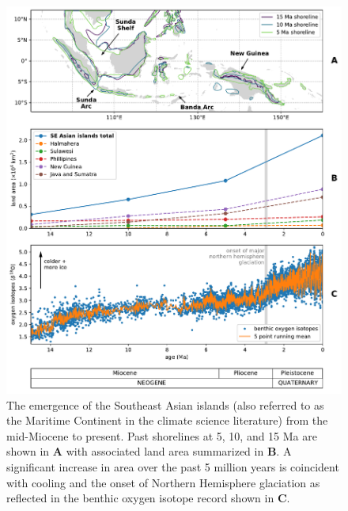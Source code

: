 \begin{figure}[!htbp]
\begin{center}
	\includegraphics[width=\textwidth]{figures/SEAIs/shoreline-growth.pdf}
	\caption[Emergence of the Southeast Asian islands from the mid-Miocene to present.]{The emergence of the Southeast Asian islands (also referred to as the Maritime Continent in the climate science literature) from the mid-Miocene to present. Past shorelines at 5, 10, and 15 Ma are shown in \textbf{A} with associated land area summarized in \textbf{B}. A significant increase in area over the past 5 million years is coincident with cooling and the onset of Northern Hemisphere glaciation as reflected in the benthic oxygen isotope record \citep{Zachos2008a} shown in \textbf{C}.}
	\label{fig:shoreline-growth}
\end{center}
\end{figure}

